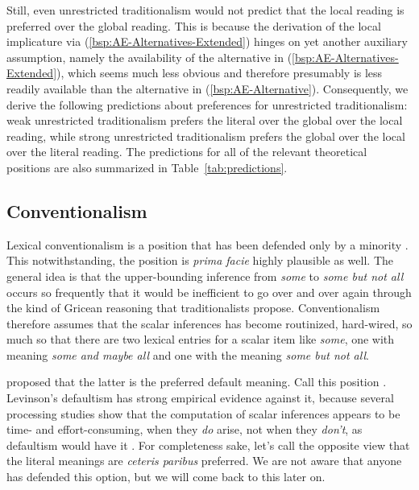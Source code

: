 \documentclass[fleqn,reqno,10pt,draft]{article}
\begin{document}
Still, even unrestricted traditionalism would not predict that the
local reading is preferred over the global reading. This is because
the derivation of the local implicature via
(\ref{bsp:AE-Alternatives-Extended}) hinges on yet another auxiliary
assumption, namely the availability of the alternative in
(\ref{bsp:AE-Alternatives-Extended}), which seems much less obvious
and therefore presumably is less readily available than the
alternative in (\ref{bsp:AE-Alternative}). Consequently, we derive the
following predictions about preferences for unrestricted
traditionalism: weak unrestricted traditionalism prefers the literal
over the global over the local reading, while strong unrestricted
traditionalism prefers the global over the local over the literal
reading. The predictions for all of the relevant theoretical positions
are also summarized in Table~\ref{tab:predictions}.


\subsection{Conventionalism}
\label{sec:conventionalism}

Lexical conventionalism is a position that has been defended only by a
minority
\citep{LevinsonPresumptiveMeanings2000,Chierchia:2004_ScalarImplicatures}. This
notwithstanding, the position is \emph{prima facie} highly plausible
as well. The
general idea is that the upper-bounding inference from \emph{some} to
\emph{some but not all} occurs so frequently that it would be
inefficient to go over and over again through the kind of Gricean
reasoning that traditionalists propose. Conventionalism therefore
assumes that the scalar inferences has become routinized, hard-wired,
so much so that there are two lexical entries for a scalar item like
\emph{some}, one with meaning \emph{some and maybe all} and one with
the meaning \emph{some but not all}.

\citet{LevinsonPresumptiveMeanings2000} proposed that the latter is
the preferred default meaning. Call this position
. Levinson's defaultism has strong empirical
evidence against it, because several processing studies show that the
computation of scalar inferences appears to be time- and
effort-consuming, when they \emph{do} arise, not when they
\emph{don't}, as defaultism would have it
\citep[c.f.][]{BrehenyKatsos2006:Are-Generalised,BrehenyKatsos2008:Experimental-In,NeysDe-NeysSchaeken2007:When-People-Are}. For
completeness sake, let's call  the
opposite view that the literal meanings are \emph{ceteris paribus}
preferred. We are not aware that anyone has defended this option, but
we will come back to this later on.
\end{document}
